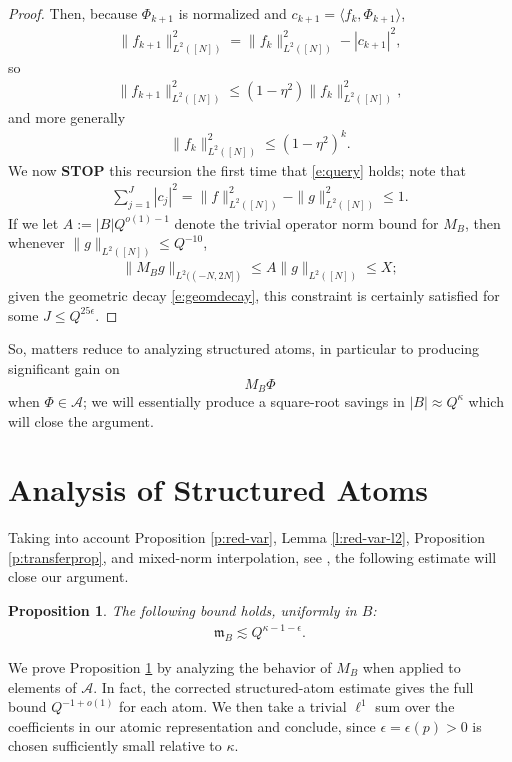 \documentclass[12pt]{amsart}
\numberwithin{equation}{section}
\newtheorem{proposition}[theorem]{Proposition}
\theoremstyle{definition}
\begin{document}
\begin{proof}
Then, because $\Phi_{k+1}$ is normalized and $c_{k+1}=\langle f_k,\Phi_{k+1}\rangle$,
\begin{align}
    \| f_{k+1}\|_{L^2([N])}^2 = \|f_k\|_{L^2([N])}^2 - |c_{k+1}|^2,
\end{align}
so
\begin{align}
    \| f_{k+1} \|_{L^2([N])}^2 \leq (1-\eta^2) \|f_k \|_{L^2([N])}^2,
\end{align}
and more generally
\begin{align}\label{e:geomdecay}
    \| f_k \|_{L^2([N])}^2 \leq (1-\eta^2)^k.
\end{align}
We now \textbf{STOP} this recursion the first time that \eqref{e:query} holds; note that
\begin{align}
    \sum_{j=1}^J |c_j|^2 = \|f \|_{L^2([N])}^2 - \|g \|_{L^2([N])}^2 \leq 1. 
\end{align}
If we let $A := |B| Q^{o(1)-1}$ denote the trivial operator norm bound for $M_B$, then whenever $\| g \|_{L^2([N])} \leq Q^{-10}$, 
\begin{align}
    \| M_B g \|_{L^2((-N,2N])} \leq A \| g \|_{L^2([N])} \leq X;
\end{align}
given the geometric decay \eqref{e:geomdecay}, this constraint is certainly satisfied for some $J \leq Q^{25\epsilon}$.
\end{proof}

So, matters reduce to analyzing structured atoms, in particular to producing significant gain on 
\[ M_B \Phi \]
when $\Phi \in \mathcal{A}$; we will essentially produce a square-root savings in $|B| \approx Q^\kappa$ which will close the argument.




\section{Analysis of Structured Atoms}\label{s:number}
Taking into account Proposition \ref{p:red-var}, Lemma \ref{l:red-var-l2}, Proposition \ref{p:transferprop}, and mixed-norm interpolation, see \cite[\S 7]{Kold}, the following estimate will close our argument.
\begin{proposition}\label{p:goal0}
    The following bound holds, uniformly in $B$:
    \begin{align}
        \mathfrak m_B \lesssim Q^{\kappa - 1 -\epsilon}.
    \end{align}
\end{proposition}

We prove Proposition \ref{p:goal0} by analyzing the behavior of $M_B$ when applied to elements of $\mathcal{A}$.  In fact, the corrected structured-atom estimate gives the full bound $Q^{-1+o(1)}$ for each atom.  We then take a trivial $\ell^1$ sum over the coefficients in our atomic representation and conclude, since $\epsilon = \epsilon(p)>0$ is chosen sufficiently small relative to $\kappa$.
\end{document}
